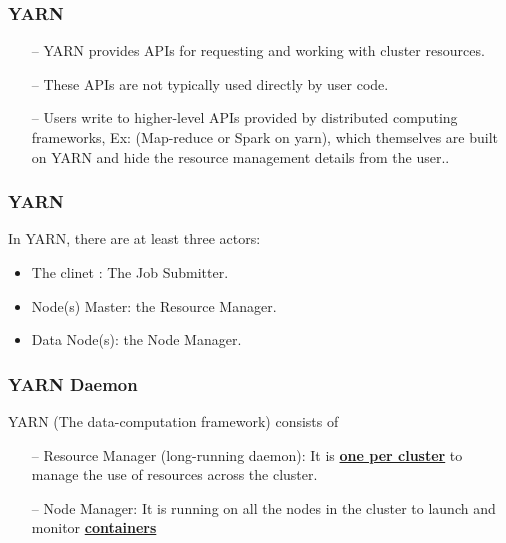 \begin{frame}[c]{ }
	\frametitle{YARN }

	{\footnotesize
		\begin{itemize}  [<+->]
			\item [--] YARN provides APIs for requesting and working with cluster resources.
			\item [--] These APIs are  not  typically  used  directly  by  user  code.
			\item [--] Users  write  to  higher-level APIs provided by distributed computing frameworks, Ex: (Map-reduce or Spark on yarn), which themselves are built on YARN and hide the resource management details from the user..
		\end{itemize}
	}
\end{frame}
\begin{frame}[c]{ }
	\frametitle{YARN }
	In YARN, there are at least three actors:	
	{\footnotesize
		\begin{itemize}  [<+->]
			\item The clinet : The Job Submitter.
			\item Node(s) Master: the Resource Manager.
			\item Data Node(s): the Node Manager.
		\end{itemize}
}

\end{frame}
\begin{frame}[c]{ }
	\frametitle{YARN Daemon}
	YARN (The data-computation framework) consists of
		\begin{itemize}  [<+->]
			\item [--] Resource Manager (long-running daemon): It is \textcolor{offyellow}{ \underline{ \textbf{one per cluster}}} to manage the use of resources across the cluster.
			\item [--] Node Manager: It is running on all the nodes in the cluster to launch and monitor \textcolor{offyellow}{ \underline{ \textbf{containers}}}
		\end{itemize}

\end{frame}

